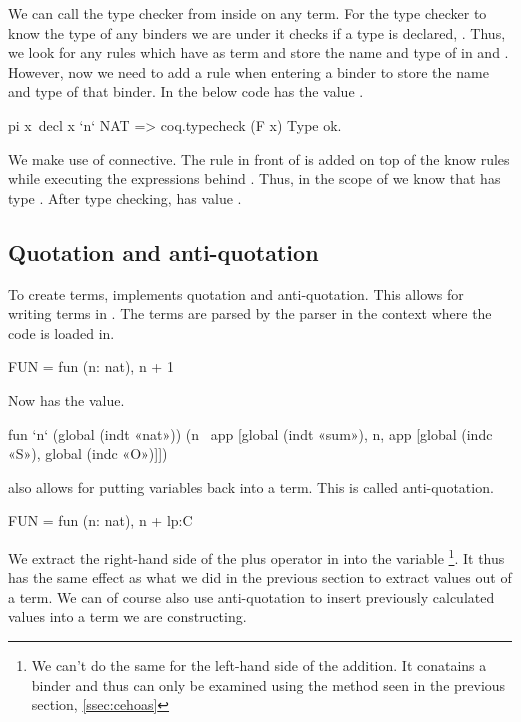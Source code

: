 \documentclass[thesis.tex]{subfiles}
\begin{document}
{{{{We can call the \coq type checker from inside \elpi on any term. For the type checker to know the type of any binders we are under it checks if a type is declared, . Thus, we look for any  rules which have as term  and store the name and type of  in  and . However, now we need to add a rule when entering a binder to store the name and type of that binder. In the below code  has the value .
\begin{elpicode}
  pi x\ decl x `n` NAT
          => coq.typecheck (F x) Type ok.
\end{elpicode}
We make use of \elpii{=>} connective. The rule in front of \elpii{=>} is added on top of the know rules while executing the expressions behind \elpii{=>}. Thus, in the scope of  we know that  has type . After type checking,  has value .

\subsection{Quotation and anti-quotation}\label{ssec:ceqoute}
To create terms, \ce implements quotation and anti-quotation. This allows for writing \coq terms in \elpi. The \coq terms are parsed by the \coq parser in the context where the \elpi code is loaded in.
\begin{elpicode}
  FUN = {{ fun (n: nat), n + 1 }}
\end{elpicode}
Now  has the value.
\begin{elpicode}
  fun `n` (global (indt «nat»)) 
            (n \ app [global (indt «sum»), 
                      n, app [global (indc «S»), 
                              global (indc «O»)]])
\end{elpicode}
\ce also allows for putting \elpi variables back into a \coq term. This is called anti-quotation.
\begin{elpicode}
  FUN = {{ fun (n: nat), n + lp:C }}
\end{elpicode}
We extract the right-hand side of the plus operator in  into the variable \footnote{We can't do the same for the left-hand side of the addition. It conatains a binder and thus can only be examined using the method seen in the previous section, \cref{ssec:cehoas}}. It thus has the same effect as what we did in the previous section to extract values out of a term. We can of course also use anti-quotation to insert previously calculated values into a term we are constructing.

}}}}
\end{document}
